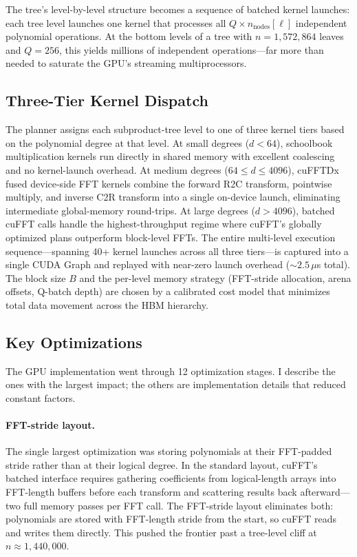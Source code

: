\documentclass[11pt]{article}
\begin{document}
The tree's level-by-level structure becomes a sequence of batched kernel
launches: each tree level launches one kernel that processes all
$Q \times n_{\text{nodes}}[\ell]$ independent polynomial operations.
At the bottom levels of a tree with $n = 1{,}572{,}864$ leaves and
$Q = 256$, this yields millions of independent operations---far more than
needed to saturate the GPU's streaming multiprocessors.

\subsection{Three-Tier Kernel Dispatch}

The planner assigns each subproduct-tree level to one of three kernel
tiers based on the polynomial degree at that level. At small degrees
($d < 64$), schoolbook multiplication kernels run directly in shared
memory with excellent coalescing and no kernel-launch overhead. At
medium degrees ($64 \le d \le 4096$), cuFFTDx fused device-side FFT
kernels combine the forward R2C transform, pointwise multiply, and
inverse C2R transform into a single on-device launch, eliminating
intermediate global-memory round-trips. At large degrees ($d > 4096$),
batched cuFFT calls handle the highest-throughput regime where cuFFT's
globally optimized plans outperform block-level FFTs. The entire
multi-level execution sequence---spanning 40+ kernel launches across
all three tiers---is captured into a single CUDA Graph and replayed
with near-zero launch overhead (${\sim}2.5\,\mu$s total). The block
size $B$ and the per-level memory strategy (FFT-stride allocation,
arena offsets, Q-batch depth) are chosen by a calibrated cost model
that minimizes total data movement across the HBM hierarchy.

\subsection{Key Optimizations}

The GPU implementation went through 12 optimization stages. I describe
the ones with the largest impact; the others are implementation details
that reduced constant factors.

\paragraph{FFT-stride layout.}
The single largest optimization was storing polynomials at their
FFT-padded stride rather than at their logical degree. In the standard
layout, cuFFT's batched interface requires gathering coefficients from
logical-length arrays into FFT-length buffers before each transform and
scattering results back afterward---two full memory passes per FFT call.
The FFT-stride layout eliminates both: polynomials are stored with
FFT-length stride from the start, so cuFFT reads and writes them
directly. This pushed the frontier past a tree-level cliff at
$n \approx 1{,}440{,}000$.
\end{document}
